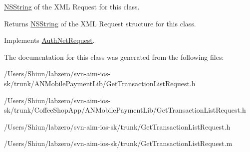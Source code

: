\hyperlink{class_n_s_string}{NSString} of the XML Request for this class. 

\begin{DoxyReturn}{Returns}
\hyperlink{class_n_s_string}{NSString} of the XML Request structure for this class. 
\end{DoxyReturn}


Implements \hyperlink{interface_auth_net_request_aab99d065f49b7ed086b041c1c70e2975}{AuthNetRequest}.



The documentation for this class was generated from the following files:\begin{DoxyCompactItemize}
\item 
/Users/Shiun/labzero/svn-\/aim-\/ios-\/sk/trunk/ANMobilePaymentLib/GetTransactionListRequest.h\item 
/Users/Shiun/labzero/svn-\/aim-\/ios-\/sk/trunk/CoffeeShopApp/ANMobilePaymentLib/GetTransactionListRequest.h\item 
/Users/Shiun/labzero/svn-\/aim-\/ios-\/sk/trunk/GetTransactionListRequest.h\item 
/Users/Shiun/labzero/svn-\/aim-\/ios-\/sk/trunk/GetTransactionListRequest.m\end{DoxyCompactItemize}
